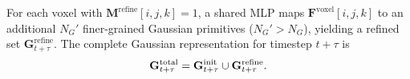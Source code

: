 


For each voxel with $\mathbf{M}^{\text{refine}}[i,j,k]=1$, a shared MLP maps $\mathbf{F}^{\text{voxel}}[i,j,k]$ to an additional $N_G'$ finer-grained Gaussian primitives ($N_G' > N_G$), yielding a refined set $\mathbf{G}^{\text{refine}}_{t+\tau}$. The complete Gaussian representation for timestep $t+\tau$ is 
\vspace{-3pt}
\begin{equation}
\mathbf{G}^{\text{total}}_{t+\tau}
= \mathbf{G}^{\text{init}}_{t+\tau} \cup \mathbf{G}^{\text{refine}}_{t+\tau}.
\vspace{-3pt}
\end{equation}

